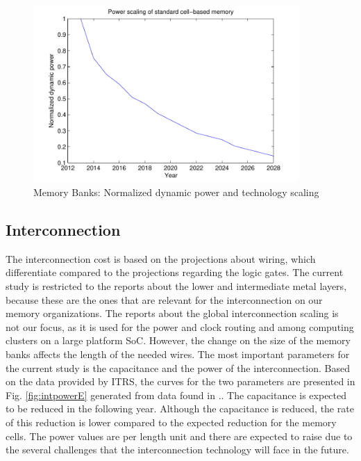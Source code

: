   \begin{figure}
 \centering
 \includegraphics[width = 0.9\textwidth]{E/cellpower.pdf}
  \caption{Memory Banks: Normalized dynamic power and technology scaling}
 \label{fig:powerE}
 \end{figure}

\subsection{Interconnection}

The interconnection cost is based on the projections about wiring, which differentiate compared to the projections regarding the logic gates.
The current study is restricted to the reports about the lower and intermediate metal layers, because these are the ones that are relevant for the interconnection on our memory organizations.
The reports about the global interconnection scaling is not our focus, as it is used for the power and clock routing and among computing clusters on a large platform SoC.
However, the change on the size of the memory banks affects the length of the needed wires.
The most important parameters for the current study is the capacitance and the power of the interconnection.
Based on the data provided by ITRS, the curves for the two parameters are presented in Fig. \ref{fig:intpowerE} generated from data found in \cite{itrs2}..
The capacitance is expected to be reduced in the following year.
Although the capacitance is reduced, the rate of this reduction is lower compared to the expected reduction for the memory cells.
The power values are per length unit and there are expected to raise due to the several challenges that the interconnection technology will face in the future.

